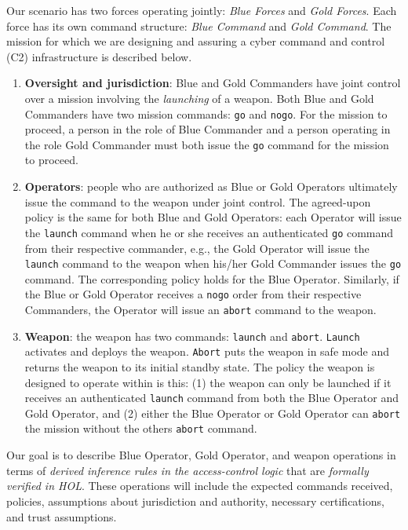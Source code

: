 Our scenario has two forces operating jointly: \emph{Blue Forces} and
\emph{Gold Forces}.  Each force has its own command structure:
\emph{Blue Command} and \emph{Gold Command}. The mission for which we
are designing and assuring a cyber command and control (C2)
infrastructure is described below.
\begin{enumerate}
\item \textbf{Oversight and jurisdiction}: Blue and Gold Commanders
  have joint control over a mission involving the \emph{launching} of
  a weapon.  Both Blue and Gold Commanders have two mission commands:
  \texttt{go} and \texttt{nogo}. For the mission to proceed, a person
  in the role of Blue Commander and a person operating in the role
  Gold Commander must both issue the \texttt{go} command for the
  mission to proceed.
\item \textbf{Operators}: people who are authorized as Blue or Gold Operators
  ultimately issue the command to the weapon under joint control. The
  agreed-upon policy is the same for both Blue and Gold Operators:
  each Operator will issue the \texttt{launch} command when he or she
  receives an authenticated \texttt{go} command from their respective
  commander, e.g., the Gold Operator will issue the \texttt{launch}
  command to the weapon when his/her Gold Commander issues the
  \texttt{go} command. The corresponding policy holds for the Blue
  Operator.  Similarly, if the Blue or Gold Operator receives a
  \texttt{nogo} order from their respective Commanders, the Operator
  will issue an \texttt{abort} command to the weapon.
\item \textbf{Weapon}: the weapon has two commands: \texttt{launch} and
  \texttt{abort}. \texttt{Launch} activates and deploys the
  weapon. \texttt{Abort} puts the weapon in safe mode and returns the
  weapon to its initial standby state. The policy the weapon is
  designed to operate within is this: (1) the weapon can only be
  launched if it receives an authenticated \texttt{launch} command
  from both the Blue Operator and Gold Operator, and (2) either the
  Blue Operator or Gold Operator can \texttt{abort} the mission
  without the others \texttt{abort} command.
\end{enumerate}

Our goal is to describe Blue Operator, Gold Operator, and weapon
operations in terms of \emph{derived inference rules in the
  access-control logic} that are \emph{formally verified in
  HOL}. These operations will include the expected commands received,
policies, assumptions about jurisdiction and authority, necessary
certifications, and trust assumptions.

